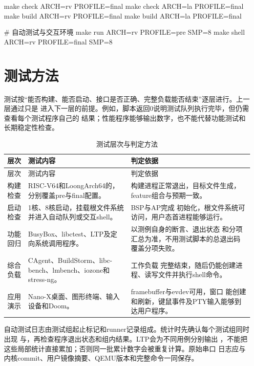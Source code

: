 \begin{bashcode}
make check ARCH=rv PROFILE=final
make check ARCH=la PROFILE=final
make build ARCH=rv PROFILE=final
make build ARCH=la PROFILE=final

# 自动测试与交互环境
make run   ARCH=rv PROFILE=pre   SMP=8
make shell ARCH=rv PROFILE=final SMP=8
\end{bashcode}

\section{测试方法}

测试按“能否构建、能否启动、接口是否正确、完整负载能否结束”逐层进行。上一层通过只是
进入下一层的前提。例如，脚本返回0说明测试队列执行完毕，但仍需查看每个测试程序自己的
结果；性能程序能够输出数字，也不能代替功能测试和长期稳定性检查。

\begin{longtable}{L{2.8cm}L{5.2cm}L{5.3cm}}
  \caption{测试层次与判定方法}\label{tab:test-method}\\
  \toprule
  层次 & 测试内容 & 判定依据 \\
  \midrule
  \endfirsthead
  \toprule
  层次 & 测试内容 & 判定依据 \\
  \midrule
  \endhead
  构建检查 & RISC-V64和LoongArch64的，分别覆盖pre与final配置。 &
  构建进程正常退出，目标文件生成，feature组合与预期一致。\\
  启动检查 & 1核、8核启动，挂载根文件系统并进入自动队列或交互shell。 & BSP与AP完成
  初始化，根文件系统可访问，用户态首进程能够运行。\\
  功能回归 & BusyBox、libctest、LTP及定向系统调用程序。 & 以测例自身的断言、退出状态
  和分项汇总为准，不用测试脚本的总退出码覆盖分项失败。\\
  综合负载 & CAgent、BuildStorm、libc-bench、lmbench、iozone和stress-ng。 & 工作负载
  完整结束，随后仍能创建进程、读写文件并执行shell命令。\\
  应用演示 & Nano-X桌面、图形终端、输入设备和Doom。 & framebuffer与evdev可用，窗口
  能创建和刷新，键鼠事件及PTY输入能够到达用户程序。\\
  \bottomrule
\end{longtable}

自动测试日志由测试组起止标记和runner记录组成。统计时先确认每个测试组同时出现
与，再检查程序退出状态和组内结果。LTP会为不同用例分别输出
，不能把这些局部统计直接累加；否则同一批累计数字会被重复计算。原始串口
日志应与内核commit、用户镜像摘要、QEMU版本和完整命令一同保存。

